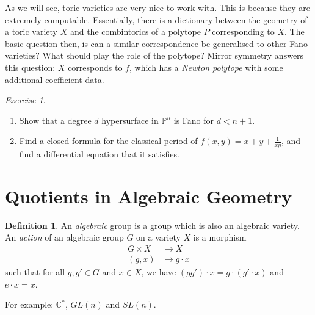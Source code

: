 \documentclass{article}
\theoremstyle{definition}
\newtheorem{definition}[theorem]{Definition}
\theoremstyle{remark}
\newtheorem{exercise}[theorem]{Exercise}
\numberwithin{theorem}{section}
\newcommand{\C}{\mathbb{C}}
\newcommand{\bP}{\mathbb{P}}
\newenvironment{defn}{
	\begin{mdframed}
		\vspace{-0.5em}
		\begin{definition}
		}{
		\end{definition}
	\end{mdframed}
}
\begin{document}
As we will see, toric varieties are very nice to work with. This is because they are extremely computable. Essentially, there is a dictionary between the geometry of a toric variety $X$ and the combintorics of a polytope $P$ corresponding to $X$. The basic question then, is can a similar correspondence be generalised to other Fano varieties? What should play the role of the polytope? Mirror symmetry answers this question: $X$ corresponds to $f$, which has a \emph{Newton polytope} with some additional coefficient data. \vspace{1em}

\begin{exercise}
	\begin{enumerate}
		\item Show that a degree $d$ hypersurface in $\bP^n$ is Fano for $d<n+1$.
		\item Find a closed formula for the classical period of $f(x,y)=x+y+\frac{1}{xy}$, and find a differential equation that it satisfies.
	\end{enumerate}
\end{exercise}

\pagebreak

\section{Quotients in Algebraic Geometry}
\begin{defn}
	An \emph{algebraic} group is a group which is also an algebraic variety. An \emph{action} of an algebraic group $G$ on a variety $X$ is a morphism 
	\begin{align*}
		G\times X &\to X\\
		(g, x) &\to g\cdot x
	\end{align*}
	such that for all $g,g' \in G$ and $x\in X$, we have $(gg')\cdot x = g\cdot (g'\cdot x)$ and $e\cdot x = x$.
\end{defn}
For example: $\C^\ast$, $GL(n)$ and $SL(n)$. \vspace{1em}
\end{document}
